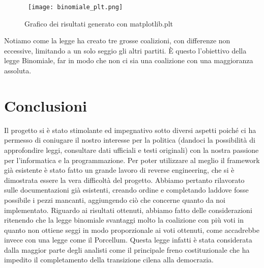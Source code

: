 \documentclass{article}
\begin{document}
\newpage

\begin{figure}[h!]
    \hbox{\hspace{-8cm}
    \texttt{[image: binomiale\_plt.png]}}
    \caption{Grafico dei risultati generato con matplotlib.plt}
    \label{fig:binomiale_plt}
\end{figure}

\newpage
Notiamo come la legge ha creato tre grosse coalizioni, con differenze non eccessive, limitando a un solo seggio gli altri partiti. È questo l'obiettivo della legge Binomiale, far in modo che non ci sia una coalizione con una maggioranza assoluta.



\section{Conclusioni}
Il progetto si è stato stimolante ed impegnativo sotto diversi aspetti poiché ci ha permesso di coniugare il nostro interesse per la politica (dandoci la possibilità di approfondire leggi, consultare dati ufficiali e testi originali) con la nostra passione per l’informatica e la programmazione.
Per poter utilizzare al meglio il framework già esistente è stato fatto un grande lavoro di reverse engineering, che si è dimostrata essere la vera difficoltà del progetto. Abbiamo pertanto rilavorato sulle documentazioni già esistenti, creando ordine e completando laddove fosse possibile i pezzi mancanti, aggiungendo ciò che concerne quanto da noi implementato.
Riguardo ai risultati ottenuti, abbiamo fatto delle considerazioni ritenendo che la legge binomiale svantaggi molto la coalizione con più voti in quanto non ottiene seggi in modo proporzionale ai voti ottenuti, come accadrebbe invece con una legge come il Porcellum.
Questa legge infatti è stata considerata dalla maggior parte degli analisti come il principale freno costituzionale che ha impedito il completamento della transizione cilena alla democrazia.
\end{document}
